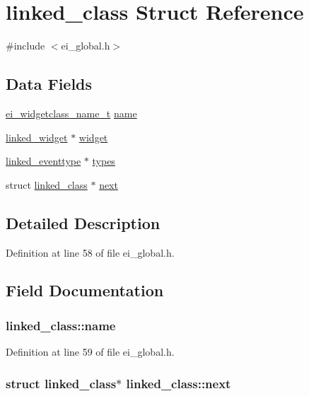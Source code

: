 \hypertarget{structlinked__class}{
\section{linked\_\-class Struct Reference}
\label{structlinked__class}
}


{\ttfamily \#include $<$ei\_\-global.h$>$}\subsection*{Data Fields}
\begin{DoxyCompactItemize}
\item 
\hyperlink{ei__widgetclass_8h_acfa18ebbfac8cbbc11345a01c2099aed}{ei\_\-widgetclass\_\-name\_\-t} \hyperlink{structlinked__class_a6abb0605095fcd4d95ee26738fcee3b3}{name}
\item 
\hyperlink{structlinked__widget}{linked\_\-widget} $\ast$ \hyperlink{structlinked__class_a13744b44ac4379e0b9ed0e936c240e12}{widget}
\item 
\hyperlink{structlinked__eventtype}{linked\_\-eventtype} $\ast$ \hyperlink{structlinked__class_a1626c90ecb1f9ff521052a39d8c8f9d8}{types}
\item 
struct \hyperlink{structlinked__class}{linked\_\-class} $\ast$ \hyperlink{structlinked__class_a88a80bf638c9fe07e48fc3053aac6a82}{next}
\end{DoxyCompactItemize}


\subsection{Detailed Description}


Definition at line 58 of file ei\_\-global.h.

\subsection{Field Documentation}
\hypertarget{structlinked__class_a6abb0605095fcd4d95ee26738fcee3b3}{
\subsubsection[{name}]{ {\bf linked\_\-class::name}}}
\label{structlinked__class_a6abb0605095fcd4d95ee26738fcee3b3}


Definition at line 59 of file ei\_\-global.h.\hypertarget{structlinked__class_a88a80bf638c9fe07e48fc3053aac6a82}{
\subsubsection[{next}]{\setlength{\rightskip}{0pt plus 5cm}struct {\bf linked\_\-class}$\ast$ {\bf linked\_\-class::next}}}
\label{structlinked__class_a88a80bf638c9fe07e48fc3053aac6a82}


